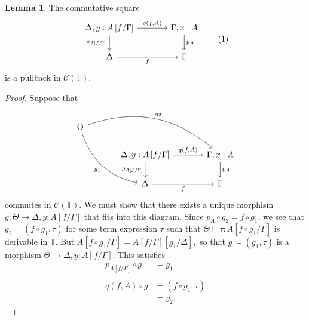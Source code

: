 \documentclass[10pt,letterpaper,cm]{nupset}
\theoremstyle{definition}
\theoremstyle{theorem}
\newtheorem{lemma}[definition]{Lemma}
\theoremstyle{remark}
\newcommand{\0}{\mathbf{0}}
\newcommand{\1}{\mathbf{1}}
\newcommand{\2}{\mathbf{2}}
\renewcommand{\c}{\mathscr{C}}
\newcommand{\T}{\mathbb T}
\begin{document}
\begin{lemma}
The commutative square
\begin{equation}
\label{eqn: cansyn} \begin{tikzcd}[column sep=large]
{\Delta, y : A\left[f/\Gamma\right]} \arrow[d, "{p_{A\left[f/\Gamma\right]}}"'] \arrow[r, "{q(f,A)}"] & {\Gamma, x :A} \arrow[d, "p_A"] \\
\Delta \arrow[r, "f"']                                                                                  & \Gamma                           
\end{tikzcd} \tag{1}
\end{equation}
 is a pullback  in $\c(\T)$.
\end{lemma}
\begin{proof}
Suppose that
\[
\begin{tikzcd}[column sep=large]
\Theta \arrow[rdd, "g_1"', bend right] \arrow[rrd, "g_2", bend left] &                                                                                                          &                                   \\
                                                                     & {\Delta, y : A\left[f/\Gamma\right]} \arrow[d, "{p_{A\left[f/\Gamma\right]}}"'] \arrow[r, "{q(f,A)}"] & {\Gamma, x :A} \arrow[d, "p_A"] \\
                                                                     & \Delta \arrow[r, "f"']                                                                                   & \Gamma                           
\end{tikzcd}
\] commutes in $\c(\T)$. We must show that there exists a unique morphism $g : \Theta \to {\Delta, y : A\left[f/\Gamma\right]}$  that fits into this diagram. Since $p_A \circ g_2 = f \circ g_1$, we see that $g_2 = \left( f \circ g_1, \tau \right)$ for some term expression $\tau$ such that $\Theta \vdash \tau : A\left[f \circ g_1/\Gamma \right]$ is derivable in $\T$. But $A\left[f \circ g_1/\Gamma \right] = A\left[f/\Gamma\right]\left[g_1/\Delta\right],$ so that $g \coloneqq \left(g_1, \tau\right)$ is a morphism $\Theta \to {\Delta, y :A[f/\Gamma]}$. This satisfies 
\begin{align*}
 p_{A\left[f/\Gamma\right]} \circ g  & = g_1 
\\ & 
\\ \label{eqn:one} q(f,A) \circ g  & =  \left(f \circ g_1, \tau\right) \tag{$\ast$}
\\ & = g_2,
\end{align*}

\end{proof}
\end{document}
